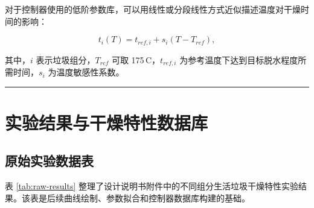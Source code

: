 \documentclass[UTF8,openany,zihao=-4,oneside]{ctexbook}
\newcommand{\manualdivider}{\par\vspace{0.6em}\noindent\textcolor{FGLine}{\rule{\linewidth}{0.7pt}}\vspace{0.6em}\par}
\begin{document}
对于控制器使用的低阶参数库，可以用线性或分段线性方式近似描述温度对干燥时间的影响：

\begin{equation}
 t_i(T)=t_{ref,i}+s_i\left(T-T_{ref}\right),
\label{eq:temperature-sensitivity}
\end{equation}

其中，$i$ 表示垃圾组分，$T_{ref}$ 可取 175\,\textdegree C，$t_{ref,i}$ 为参考温度下达到目标脱水程度所需时间，$s_i$ 为温度敏感性系数。

\manualdivider

\chapter{实验结果与干燥特性数据库}

\section{原始实验数据表}

表 \ref{tab:raw-results} 整理了设计说明书附件中的不同组分生活垃圾干燥特性实验结果。该表是后续曲线绘制、参数拟合和控制器数据库构建的基础。
\end{document}
